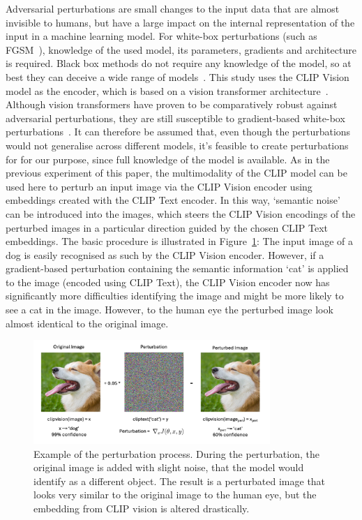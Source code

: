 Adversarial perturbations are small changes to the input data that are almost invisible to humans, but have a large impact on the internal representation of the input in a machine learning model. For white-box perturbations (such as FGSM~\cite{goodfellowExplainingHarnessingAdversarial2014}), knowledge of the used model, its parameters, gradients and architecture is required. Black box methods do not require any knowledge of the model, so at best they can deceive a wide range of models~\cite{papernotPracticalBlackBoxAttacks2017}. This study uses the CLIP Vision model as the encoder, which is based on a vision transformer architecture~\cite{dosovitskiyImageWorth16x162021}. Although vision transformers have proven to be comparatively robust against adversarial perturbations, they are still susceptible to gradient-based white-box perturbations~\cite{naseerIntriguingPropertiesVision2021}. It can therefore be assumed that, even though the perturbations would not generalise across different models, it's feasible to create perturbations for for our purpose, since full knowledge of the model is available. As in the previous experiment of this paper, the multimodality of the CLIP model can be used here to perturb an input image via the CLIP Vision encoder using embeddings created with the CLIP Text encoder. In this way, `semantic noise' can be introduced into the images, which steers the CLIP Vision encodings of the perturbed images in a particular direction guided by the chosen CLIP Text embeddings. The basic procedure is illustrated in Figure~\ref{fig:perturbation_example}: The input image of a dog is easily recognised as such by the CLIP Vision encoder. However, if a gradient-based perturbation containing the semantic information `cat' is applied to the image  (encoded using CLIP Text), the CLIP Vision encoder now has significantly more difficulties identifying the image and might be more likely to see a cat in the image. However, to the human eye the perturbed image look almost identical to the original image.

\begin{figure}[ht]
    \centering
    \includegraphics[width=0.8\textwidth]{plots/peturbation_example.png}
    \caption[Example of the perturbation process]{Example of the perturbation process. During the perturbation, the original image is added with slight noise, that the model would identify as a different object. The result is a perturbated image that looks very similar to the original image to the human eye, but the embedding from CLIP vision is altered drastically.}\label{fig:perturbation_example}
\end{figure}

